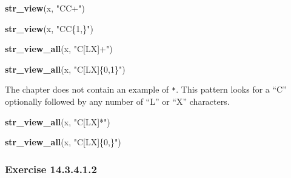 \documentclass[]{book}
\newenvironment{Shaded}{\begin{snugshade}}{\end{snugshade}}
\newcommand{\KeywordTok}[1]{\textcolor[rgb]{0.13,0.29,0.53}{\textbf{#1}}}
\newcommand{\NormalTok}[1]{#1}
\newcommand{\StringTok}[1]{\textcolor[rgb]{0.31,0.60,0.02}{#1}}
\theoremstyle{plain}
\theoremstyle{remark}
\begin{document}
\begin{Shaded}
\begin{Highlighting}[]
\KeywordTok{str_view}\NormalTok{(x, }\StringTok{"CC+"}\NormalTok{)}
\end{Highlighting}
\end{Shaded}

\begin{Shaded}
\begin{Highlighting}[]
\KeywordTok{str_view}\NormalTok{(x, }\StringTok{"CC\{1,\}"}\NormalTok{)}
\end{Highlighting}
\end{Shaded}

\begin{Shaded}
\begin{Highlighting}[]
\KeywordTok{str_view_all}\NormalTok{(x, }\StringTok{"C[LX]+"}\NormalTok{)}
\end{Highlighting}
\end{Shaded}

\begin{Shaded}
\begin{Highlighting}[]
\KeywordTok{str_view_all}\NormalTok{(x, }\StringTok{"C[LX]\{0,1\}"}\NormalTok{)}
\end{Highlighting}
\end{Shaded}

The chapter does not contain an example of \texttt{*}. This pattern
looks for a ``C'' optionally followed by any number of ``L'' or ``X''
characters.

\begin{Shaded}
\begin{Highlighting}[]
\KeywordTok{str_view_all}\NormalTok{(x, }\StringTok{"C[LX]*"}\NormalTok{)}
\end{Highlighting}
\end{Shaded}

\begin{Shaded}
\begin{Highlighting}[]
\KeywordTok{str_view_all}\NormalTok{(x, }\StringTok{"C[LX]\{0,\}"}\NormalTok{)}
\end{Highlighting}
\end{Shaded}

\hypertarget{exercise-14.3.4.1.2}{%
\subsubsection*{\texorpdfstring{Exercise
{14.3.4.1.2}}{Exercise 14.3.4.1.2}}\label{exercise-14.3.4.1.2}}
\end{document}
